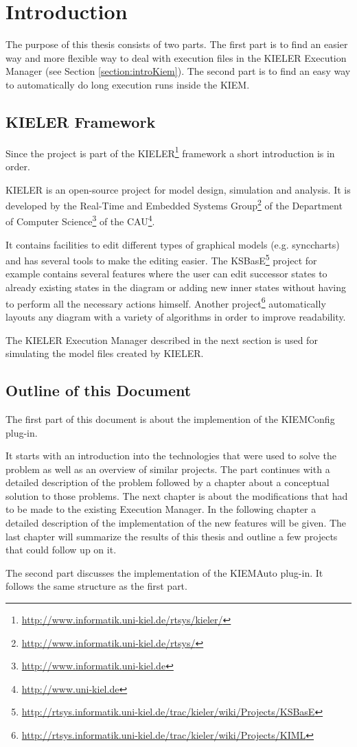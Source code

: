 \chapter{Introduction}
\label{chapter:introduction}
The purpose of this thesis consists of two parts. The first part is to find an easier way and
more flexible way to deal with execution files in the \ac{KIELER} Execution Manager (see Section
\ref{section:introKiem}). The second part
is to find an easy way to automatically do long execution runs inside the \ac{KIEM}.

\section{KIELER Framework}
\label{section:introKieler}
Since the project is part of the \ac{KIELER}\footnote{\url{http://www.informatik.uni-kiel.de/rtsys/kieler/}}
framework a short introduction is in order.

\ac{KIELER} is an open-source project for model design, simulation and analysis. It is developed 
by the Real-Time and Embedded Systems Group\footnote{\url{http://www.informatik.uni-kiel.de/rtsys/}}
of the Department of Computer Science\footnote{\url{http://www.informatik.uni-kiel.de}}
of the \ac{CAU}\footnote{\url{http://www.uni-kiel.de}}.

It contains facilities to edit different types of graphical models (e.g. synccharts) and has several
tools to make the editing easier. The \ac{KSBasE}\footnote{\url{http://rtsys.informatik.uni-kiel.de/trac/kieler/wiki/Projects/KSBasE}} 
project for example contains several features where the user can edit successor states to already existing states in the diagram or
adding new inner states without having to perform all the necessary actions himself. Another 
project\footnote{\url{http://rtsys.informatik.uni-kiel.de/trac/kieler/wiki/Projects/KIML}}
automatically layouts any diagram with a variety of algorithms in order to improve readability.

The \ac{KIELER} Execution Manager described in the next section is used for simulating the
model files created by \ac{KIELER}.


\section{Outline of this Document}
\label{section:introOutline}
The first part of this document is about the implemention of the \ac{KIEMConfig} plug-in.

It starts with an introduction into the technologies that were used to solve the problem as well
as an overview of similar projects. The part continues with a detailed description of the problem
followed by a chapter about a conceptual solution to those problems. The next chapter is about the
modifications that had to be made to the existing Execution Manager. In the following chapter a detailed
description of the implementation of the new features will be given. The last chapter will summarize
the results of this thesis and outline a few projects that could follow up on it.

The second part discusses the implementation of the \ac{KIEMAuto} plug-in. It follows the same structure
as the first part.



